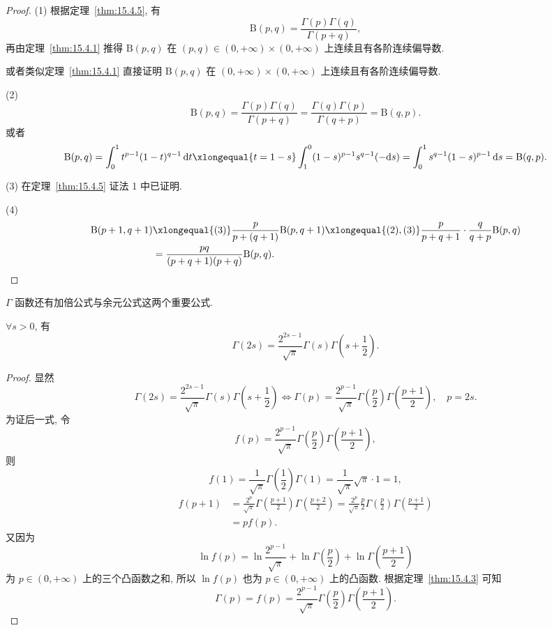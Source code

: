 \begin{proof}
(1) 根据定理~\ref{thm:15.4.5}, 有
\[
  \mathrm{B}(p,q)=\frac{\Gamma(p)\Gamma(q)}{\Gamma(p+q)},
\]
再由定理~\ref{thm:15.4.1} 推得 $\mathrm{B}(p,q)$ 在 $(p,q)\in(0,+\infty)\times(0,+\infty)$ 上连续且有各阶连续偏导数.

或者类似定理~\ref{thm:15.4.1} 直接证明 $\mathrm{B}(p,q)$ 在 $(0,+\infty)\times(0,+\infty)$ 上连续且有各阶连续偏导数.

(2)
\[
  \mathrm{B}(p,q)=\frac{\Gamma(p)\Gamma(q)}{\Gamma(p+q)}=\frac{\Gamma(q)\Gamma(p)}{\Gamma(q+p)}=\mathrm{B}(q,p).
\]
或者
\[
  \mathrm{B}(p,q)=\int_{0}^{1}t^{p-1}(1-t)^{q-1}\,\mathrm{d}t\xlongequal{t=1-s}\int_{1}^{0}(1-s)^{p-1}s^{q-1}(-\mathrm{d}s)=\int_{0}^{1}s^{q-1}(1-s)^{p-1}\,\mathrm{d}s=\mathrm{B}(q,p).
\]

(3) 在定理~\ref{thm:15.4.5} 证法 1 中已证明.

(4)
\[
  \begin{aligned}
    \mathrm{B}(p+1,q+1)&\xlongequal{(3)}\frac{p}{p+(q+1)}\mathrm{B}(p,q+1)\xlongequal{(2),(3)}\frac{p}{p+q+1}\cdot\frac{q}{q+p}\mathrm{B}(p,q)\\
    &=\frac{pq}{(p+q+1)(p+q)}\mathrm{B}(p,q).
  \end{aligned}
\]
\end{proof}

$\Gamma$ 函数还有加倍公式与余元公式这两个重要公式.

\begin{theorem}[加倍公式]\label{thm:15.4.7}
$\forall s>0$, 有
\[
  \Gamma(2s)=\frac{2^{2s-1}}{\sqrt{\pi}}\Gamma(s)\Gamma\left(s+\frac{1}{2}\right).
\]
\end{theorem}

\begin{proof}
显然
\[
  \Gamma(2s)=\frac{2^{2s-1}}{\sqrt{\pi}}\Gamma(s)\Gamma\left(s+\frac{1}{2}\right) \iff \Gamma(p)=\frac{2^{p-1}}{\sqrt{\pi}}\Gamma\left(\frac{p}{2}\right)\Gamma\left(\frac{p+1}{2}\right),\quad p=2s.
\]
为证后一式, 令
\[
  f(p)=\frac{2^{p-1}}{\sqrt{\pi}}\Gamma\left(\frac{p}{2}\right)\Gamma\left(\frac{p+1}{2}\right),
\]
则
\[
  f(1)=\frac{1}{\sqrt{\pi}}\Gamma\left(\frac{1}{2}\right)\Gamma(1)=\frac{1}{\sqrt{\pi}}\sqrt{\pi}\cdot 1=1,
\]
\[
  \begin{aligned}
    f(p+1)&=\frac{2^{p}}{\sqrt{\pi}}\Gamma\left(\frac{p+1}{2}\right)\Gamma\left(\frac{p+2}{2}\right)=\frac{2^{p}}{\sqrt{\pi}}\frac{p}{2}\Gamma\left(\frac{p}{2}\right)\Gamma\left(\frac{p+1}{2}\right)\\
    &=pf(p).
  \end{aligned}
\]
又因为
\[
  \ln f(p)=\ln\frac{2^{p-1}}{\sqrt{\pi}}+\ln\Gamma\left(\frac{p}{2}\right)+\ln\Gamma\left(\frac{p+1}{2}\right)
\]
为 $p\in(0,+\infty)$ 上的三个凸函数之和, 所以 $\ln f(p)$ 也为 $p\in(0,+\infty)$ 上的凸函数. 根据定理~\ref{thm:15.4.3} 可知
\[
  \Gamma(p)=f(p)=\frac{2^{p-1}}{\sqrt{\pi}}\Gamma\left(\frac{p}{2}\right)\Gamma\left(\frac{p+1}{2}\right).
\]
\end{proof}

